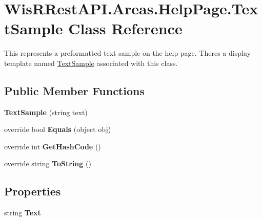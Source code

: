 \hypertarget{class_wis_r_rest_a_p_i_1_1_areas_1_1_help_page_1_1_text_sample}{}\section{Wis\+R\+Rest\+A\+P\+I.\+Areas.\+Help\+Page.\+Text\+Sample Class Reference}
\label{class_wis_r_rest_a_p_i_1_1_areas_1_1_help_page_1_1_text_sample}


This represents a preformatted text sample on the help page. There\textquotesingle{}s a display template named \hyperlink{class_wis_r_rest_a_p_i_1_1_areas_1_1_help_page_1_1_text_sample}{Text\+Sample} associated with this class.  


\subsection*{Public Member Functions}
\begin{DoxyCompactItemize}
\item 
\hypertarget{class_wis_r_rest_a_p_i_1_1_areas_1_1_help_page_1_1_text_sample_ac3ad6281ea3d491c031597029b8e7dda}{}{\bfseries Text\+Sample} (string text)\label{class_wis_r_rest_a_p_i_1_1_areas_1_1_help_page_1_1_text_sample_ac3ad6281ea3d491c031597029b8e7dda}

\item 
\hypertarget{class_wis_r_rest_a_p_i_1_1_areas_1_1_help_page_1_1_text_sample_ae6dbc86b786886f6bb8cab73af5b5453}{}override bool {\bfseries Equals} (object obj)\label{class_wis_r_rest_a_p_i_1_1_areas_1_1_help_page_1_1_text_sample_ae6dbc86b786886f6bb8cab73af5b5453}

\item 
\hypertarget{class_wis_r_rest_a_p_i_1_1_areas_1_1_help_page_1_1_text_sample_ab43845d2e55b076c54bdf8223fc6a101}{}override int {\bfseries Get\+Hash\+Code} ()\label{class_wis_r_rest_a_p_i_1_1_areas_1_1_help_page_1_1_text_sample_ab43845d2e55b076c54bdf8223fc6a101}

\item 
\hypertarget{class_wis_r_rest_a_p_i_1_1_areas_1_1_help_page_1_1_text_sample_a2446a88ea1d19eab31bbbc67fe0d7a02}{}override string {\bfseries To\+String} ()\label{class_wis_r_rest_a_p_i_1_1_areas_1_1_help_page_1_1_text_sample_a2446a88ea1d19eab31bbbc67fe0d7a02}

\end{DoxyCompactItemize}
\subsection*{Properties}
\begin{DoxyCompactItemize}
\item 
\hypertarget{class_wis_r_rest_a_p_i_1_1_areas_1_1_help_page_1_1_text_sample_a9e4944e4387798d02d1fa5c9c08d1cee}{}string {\bfseries Text}\label{class_wis_r_rest_a_p_i_1_1_areas_1_1_help_page_1_1_text_sample_a9e4944e4387798d02d1fa5c9c08d1cee}

\end{DoxyCompactItemize}


